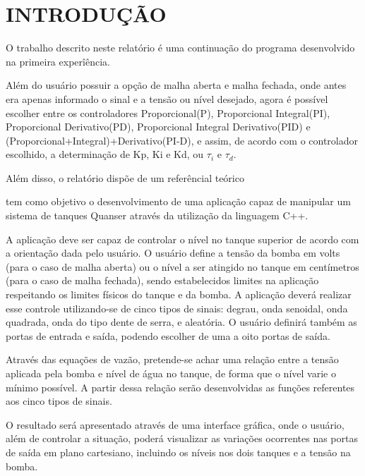 \documentclass[a4paper,12pt]{article}
\begin{document}
\newpage


\thispagestyle{main}

\section{INTRODUÇÃO}

\begin{flushleft}
\hspace{4ex}O trabalho descrito neste relatório é uma continuação do programa desenvolvido na primeira experîência.

\hspace{4ex}Além do usuário possuir a opção de malha aberta e malha fechada, onde antes era apenas informado o sinal e a tensão ou nível desejado, agora é possível escolher entre os controladores Proporcional(P), Proporcional Integral(PI), Proporcional Derivativo(PD), Proporcional Integral Derivativo(PID) e (Proporcional+Integral)+Derivativo(PI-D), e assim, de acordo com o controlador escolhido, a determinação de Kp, Ki e Kd, ou    $\tau_i$ e $\tau_d.$

\hspace{4ex}Além disso, o relatório dispõe de um referêncial teórico 

 tem como objetivo o desenvolvimento de uma aplicação capaz de manipular um sistema de tanques Quanser através da utilização da linguagem C++.

A aplicação deve ser capaz de controlar o nível no tanque superior de acordo com a orientação dada pelo usuário. O usuário define a tensão da bomba em volts (para o caso de malha aberta) ou o nível a ser atingido no tanque em centímetros (para o caso de malha fechada), sendo estabelecidos limites na aplicação respeitando os limites físicos do tanque e da bomba. A aplicação deverá realizar esse controle utilizando-se de cinco tipos de sinais: degrau, onda senoidal, onda quadrada, onda do tipo dente de serra, e aleatória. O usuário definirá também as portas de entrada e saída, podendo escolher de uma a oito portas de saída.

Através das equações de vazão, pretende-se achar uma relação entre a tensão aplicada pela bomba e nível de água no tanque, de forma que o nível varie o mínimo possível. A partir dessa relação serão desenvolvidas as funções referentes aos cinco tipos de sinais.

O resultado será apresentado através de uma interface gráfica, onde o usuário, além de controlar a situação, poderá visualizar as variações ocorrentes nas portas de saída em plano cartesiano, incluindo os níveis nos dois tanques e a tensão na bomba.
\end{flushleft}
\end{document}
